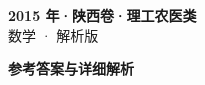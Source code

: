 \documentclass[zihao=-4, a4paper]{ctexart}
\begin{document}
\begin{center}
  {\Large\bfseries 2015 年·陕西卷·理工农医类}\\[4pt]
  {\large 数学 · 解析版}
\end{center}
\medskip
{}

\clearpage
{}
\begin{center}{\Large\bfseries 参考答案与详细解析}\end{center}
\medskip

\end{document}
